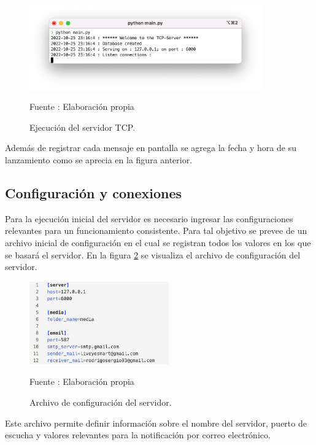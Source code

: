 \begin{figure}[H]
    \begin{center}
        \includegraphics[width=10cm]{img/capitulo_5/tcp_server.png}
        \caption{Ejecución del servidor TCP.}
        Fuente : Elaboración propia
        \label{fig:servertcp_console}
    \end{center}
\end{figure}
Además de registrar cada mensaje en pantalla se agrega la fecha y hora de su lanzamiento como se aprecia en la figura anterior.
\subsection{Configuración y conexiones}
Para la ejecución inicial del servidor es necesario ingresar las configuraciones relevantes para un funcionamiento consistente. Para tal objetivo se prevee de un archivo inicial de configuración en el cual se registran todos los valores en los que se basará el servidor. En la figura \ref{fig:config_file} se visualiza el archivo de configuración del servidor.\\

\begin{figure}[H]
    \begin{center}
        \includegraphics[width=6cm]{img/capitulo_5/config.ini.png}
    \end{center}
    \begin{center}
        \caption{Archivo de configuración del servidor.}
        Fuente : Elaboración propia
        \label{fig:config_file}
    \end{center}
\end{figure}

Este archivo permite definir información sobre el nombre del servidor, puerto de escucha y valores relevantes para la notificación por correo electrónico.\\

